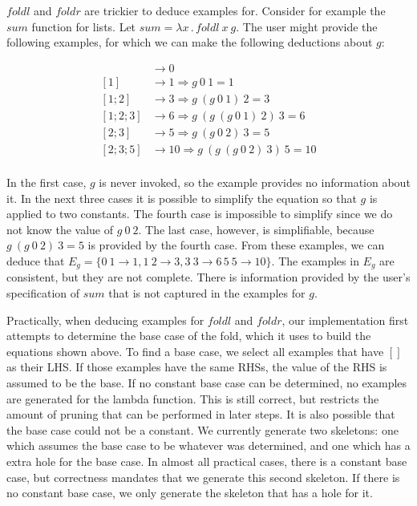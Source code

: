 \documentclass[11pt]{article}
\begin{document}
$foldl$ and $foldr$ are trickier to deduce examples for. Consider for
example the $sum$ function for lists. Let $sum = \lambda
x\,.\,foldl~x~g$. The user might provide the following examples, for
which we can make the following deductions about $g$:

\begin{align*}
[] &\rightarrow 0 \\
[1] &\rightarrow 1 \Rightarrow g~0~1 = 1 \\
[1; 2] &\rightarrow 3 \Rightarrow g~(g~0~1)~2 = 3 \\
[1; 2; 3] &\rightarrow 6 \Rightarrow g~(g~(g~0~1)~2)~3 = 6 \\
[2; 3] &\rightarrow 5 \Rightarrow g~(g~0~2)~3 = 5 \\
[2; 3; 5] &\rightarrow 10 \Rightarrow g~(g~(g~0~2)~3)~5 = 10 \\
\end{align*}

In the first case, $g$ is never invoked, so the example provides no
information about it. In the next three cases it is possible to
simplify the equation so that $g$ is applied to two constants. The
fourth case is impossible to simplify since we do not know the value
of $g~0~2$. The last case, however, is simplifiable, because
$g~(g~0~2)~3 = 5$ is provided by the fourth case. From these examples,
we can deduce that $E_g = \{0~1 \rightarrow 1, 1~2 \rightarrow 3, 3~3
\rightarrow 6\, 5~5 \rightarrow 10\}$. The examples in $E_g$ are
consistent, but they are not complete. There is information provided
by the user's specification of $sum$ that is not captured in the
examples for $g$.

Practically, when deducing examples for $foldl$ and $foldr$, our
implementation first attempts to determine the base case of the fold,
which it uses to build the equations shown above. To find a base case,
we select all examples that have $[]$ as their LHS. If those examples
have the same RHSs, the value of the RHS is assumed to be the base. If
no constant base case can be determined, no examples are generated for
the lambda function. This is still correct, but restricts the amount
of pruning that can be performed in later steps. It is also possible
that the base case could not be a constant. We currently generate two
skeletons: one which assumes the base case to be whatever was
determined, and one which has a extra hole for the base case. In
almost all practical cases, there is a constant base case, but
correctness mandates that we generate this second skeleton. If there
is no constant base case, we only generate the skeleton that has a
hole for it.
\end{document}
